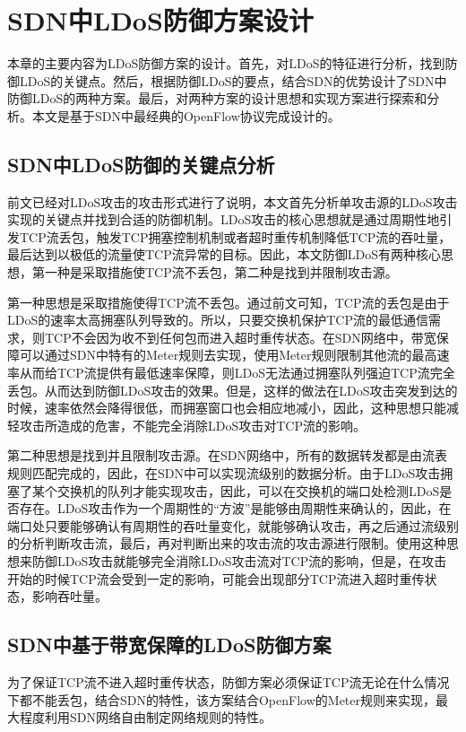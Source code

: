 \chapter{SDN中LDoS防御方案设计}
\label{cha:design}
本章的主要内容为LDoS防御方案的设计。首先，对LDoS的特征进行分析，找到防御LDoS的关键点。然后，根据防御LDoS的要点，结合SDN的优势设计了SDN中防御LDoS的两种方案。最后，对两种方案的设计思想和实现方案进行探索和分析。本文是基于SDN中最经典的OpenFlow协议完成设计的。

\section{SDN中LDoS防御的关键点分析}
\label{chap4:keyanalysis}
前文已经对LDoS攻击的攻击形式进行了说明，本文首先分析单攻击源的LDoS攻击实现的关键点并找到合适的防御机制。LDoS攻击的核心思想就是通过周期性地引发TCP流丢包，触发TCP拥塞控制机制或者超时重传机制降低TCP流的吞吐量，最后达到以极低的流量使TCP流异常的目标。因此，本文防御LDoS有两种核心思想，第一种是采取措施使TCP流不丢包，第二种是找到并限制攻击源。

第一种思想是采取措施使得TCP流不丢包。通过前文可知，TCP流的丢包是由于LDoS的速率太高拥塞队列导致的。所以，只要交换机保护TCP流的最低通信需求，则TCP不会因为收不到任何包而进入超时重传状态。在SDN网络中，带宽保障可以通过SDN中特有的Meter规则去实现，使用Meter规则限制其他流的最高速率从而给TCP流提供有最低速率保障，则LDoS无法通过拥塞队列强迫TCP流完全丢包。从而达到防御LDoS攻击的效果。但是，这样的做法在LDoS攻击突发到达的时候，速率依然会降得很低，而拥塞窗口也会相应地减小，因此，这种思想只能减轻攻击所造成的危害，不能完全消除LDoS攻击对TCP流的影响。

第二种思想是找到并且限制攻击源。在SDN网络中，所有的数据转发都是由流表规则匹配完成的，因此，在SDN中可以实现流级别的数据分析。由于LDoS攻击拥塞了某个交换机的队列才能实现攻击，因此，可以在交换机的端口处检测LDoS是否存在。LDoS攻击作为一个周期性的“方波”是能够由周期性来确认的，因此，在端口处只要能够确认有周期性的吞吐量变化，就能够确认攻击，再之后通过流级别的分析判断攻击流，最后，再对判断出来的攻击流的攻击源进行限制。使用这种思想来防御LDoS攻击就能够完全消除LDoS攻击流对TCP流的影响，但是，在攻击开始的时候TCP流会受到一定的影响，可能会出现部分TCP流进入超时重传状态，影响吞吐量。

\section{SDN中基于带宽保障的LDoS防御方案}
\label{chap4:bandguatee}

为了保证TCP流不进入超时重传状态，防御方案必须保证TCP流无论在什么情况下都不能丢包，结合SDN的特性，该方案结合OpenFlow的Meter规则来实现，最大程度利用SDN网络自由制定网络规则的特性。

